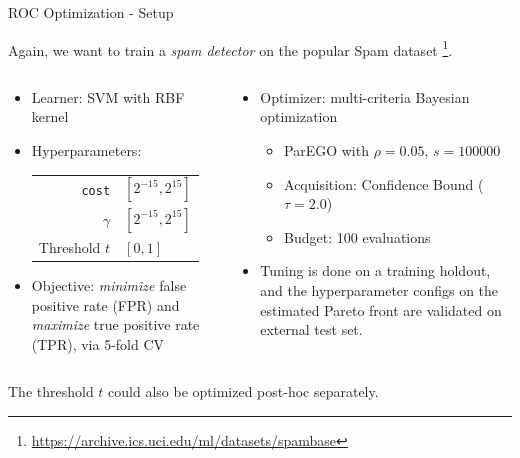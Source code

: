 \documentclass[11pt,compress,t,notes=noshow,xcolor=table]{beamer}
\begin{document}
\begin{vbframe}{ROC Optimization - Setup}

Again, we want to train a \textit{spam detector} on the popular Spam dataset%
\footnote{\url{https://archive.ics.uci.edu/ml/datasets/spambase}}.

\vspace{-0.2cm}

\begin{columns}
\begin{column}{0.5\textwidth}
\begin{itemize}
  \item Learner: SVM with RBF kernel
  \item Hyperparameters:
  \begin{tabular}{rl}
    \texttt{cost} & $[2^{-15}, 2^{15}]$ \\
    $\gamma$      & $[2^{-15}, 2^{15}]$ \\
    Threshold $t$ & $[0,1]$ 
  \end{tabular}
  \item Objective: \emph{minimize} false positive rate (FPR) and \emph{maximize} true positive rate (TPR), via 5-fold CV
\end{itemize}
\end{column}
\begin{column}{0.5\textwidth}
\begin{itemize}
  \item Optimizer: multi-criteria Bayesian optimization
  \begin{itemize}
    \item ParEGO with $\rho=0.05$, $s=100000$
    \item Acquisition: Confidence Bound ($\tau=2.0$)
    \item Budget: 100 evaluations
  \end{itemize}
  \item Tuning is done on a training holdout, and the hyperparameter configs on the estimated Pareto front are validated on external test set.
\end{itemize}
\end{column}
\end{columns}
\vspace{0.1cm}
{\footnotesize The threshold $t$ could also be optimized post-hoc separately.}

\end{vbframe}
\end{document}
